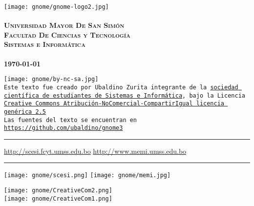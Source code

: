 \documentclass[12pt,letterpaper]{book}
\begin{document}
 \begin{titlepage}
	\thispagestyle{empty}
	\begin{center}
		\texttt{[image: gnome/gnome-logo2.jpg]} \\
		~\\
		\Large{\textsc{\bf Universidad Mayor De San Simón}}\\
		\large{\textsc{\bf Facultad De Ciencias y Tecnología}}\\
		\large{\textsc{\bf Sistemas e Informática}}\\
		~\\
		\small{\bf \today}
	\end{center}
 	\vfill
	\begin{center}
	\texttt{[image: gnome/by-nc-sa.jpg]}\\
{\small \tt Este texto fue creado por Ubaldino Zurita  integrante de la \href{http://scesi.fcyt.umss.edu.bo}{sociedad científica de estudiantes de Sistemas e Informática}, bajo la Licencia\\ \href{http://creativecommons.org/licenses/by-nc-sa/2.5/deed.es}{Creative Commons Atribución-NoComercial-CompartirIgual licencia genérica 2.5}\\
Las fuentes del texto se encuentran en \url{https://github.com/ubaldino/gnome3}}
     \end{center}
	\hrule
	\vspace{0.1cm}
	\noindent\small{\url{http://scesi.fcyt.umss.edu.bo} \hfill \url{http://www.memi.umss.edu.bo}}
	\hrule
	\vspace{0.1cm}
	\noindent\small{\hspace{1.15cm}\texttt{[image: gnome/scesi.png]} \hfill \texttt{[image: gnome/memi.jpg]}\hspace{0.83cm}}
\end{titlepage}
\thispagestyle{empty}
\begin{center}

\texttt{[image: gnome/CreativeCom2.png]}\\
\texttt{[image: gnome/CreativeCom1.png]}  
\end{center}

\tableofcontents
\end{document}
